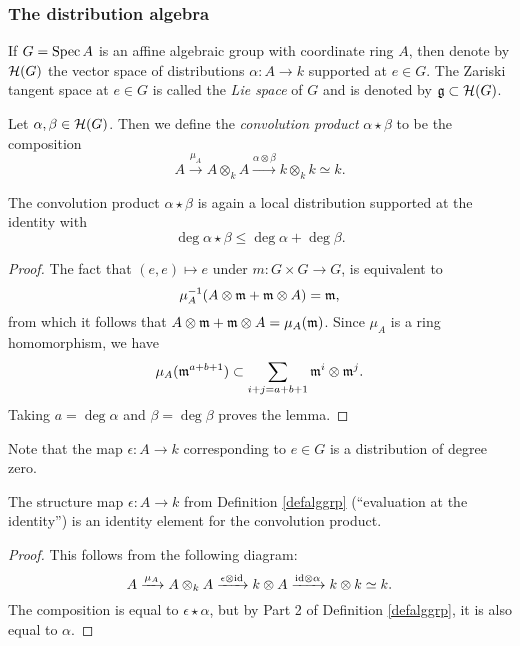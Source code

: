 \documentclass[11pt, english]{article}
\begin{document}
\subsubsection{The distribution algebra}

If $G=\operatorname{Spec} A$ is an affine algebraic group with coordinate ring $A$, then denote by $\mathcal{H}(G)$ the vector space of distributions $\alpha:A \to k$ supported at $e \in G$. The Zariski tangent space at $e \in G$ is called the \emph{Lie space} of $G$ and is denoted by $\mathfrak g \subset \mathcal{H}(G)$.

\begin{defi}
 Let $\alpha,\beta \in \mathcal{H}(G)$. Then we define the \emph{convolution product} $\alpha \star \beta$ to be the composition
$$
A \xrightarrow{\mu_A} A \otimes_k A \xrightarrow{\alpha \otimes \beta} k \otimes_k k \simeq k.
$$
\end{defi}

\begin{lemma}
The convolution product $\alpha \star \beta$ is again a local distribution supported at the identity with
$$
\deg \alpha \star \beta \leq \deg \alpha + \deg \beta.
$$
\end{lemma}
\begin{proof}
The fact that $(e,e) \mapsto e$ under $m:G \times G \to G$, is equivalent to
$$
\mu_A^{-1}(A \otimes \mathfrak{m} + \mathfrak{m} \otimes A)=\mathfrak{m},
$$
from which it follows that $A \otimes \mathfrak{m} + \mathfrak{m} \otimes A = \mu_A(\mathfrak{m})$. Since $\mu_A$ is a ring homomorphism, we have
$$
\mu_A(\mathfrak{m}^{a+b+1}) \subset \sum_{i+j=a+b+1} \mathfrak{m}^i \otimes \mathfrak{m}^j.
$$
Taking $a = \deg \alpha$ and $\beta = \deg \beta$ proves the lemma.
\end{proof}

Note that the map $\epsilon:A \to k$ corresponding to $e \in G$ is a distribution of degree zero.

\begin{lemma}
The structure map $\epsilon:A \to k$ from Definition \ref{defalggrp} (``evaluation at the identity'') is an identity element for the convolution product.
\end{lemma}
\begin{proof}
This follows from the following diagram:
\[
A \xrightarrow{\mu_A} A \otimes_k A \xrightarrow{\epsilon \otimes \text{id}} k \otimes A \xrightarrow{\text{id} \otimes \alpha} k \otimes k \simeq k.
\]
The composition is equal to $\epsilon \star \alpha$, but by Part 2 of Definition \ref{defalggrp}, it is also equal to $\alpha$.
\end{proof}
\end{document}
